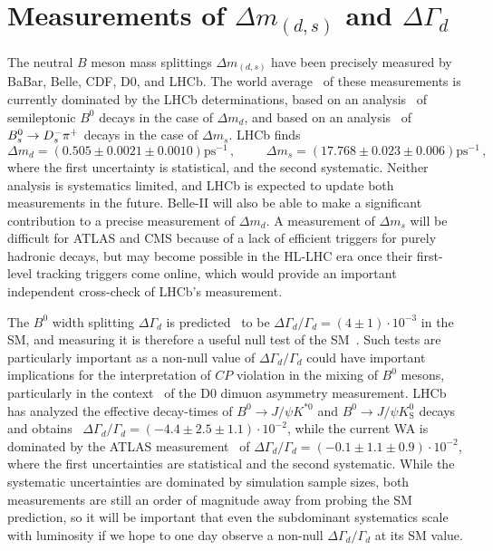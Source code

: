 \section{Measurements of $\Delta m_{(d,s)}$ and $\Delta\Gamma_d$}
\label{sec:dmdgd}

The neutral $B$ meson mass splittings $\Delta m_{(d,s)}$ have been precisely measured by BaBar, Belle, CDF, D0, and LHCb.
The world average~\cite{HFAG} of these measurements is currently dominated by the LHCb determinations,
based on an analysis~\cite{LHCb-PAPER-2015-031} of semileptonic $B^0$ decays in the case of $\Delta m_d$, and based on an analysis~\cite{LHCb-PAPER-2013-006} of $B^0_s \rightarrow {\ensuremath{D}}^-_s \pi^+$ decays
in the case of $\Delta m_s$. LHCb finds
\begin{equation}
\Delta m_d = (0.505 \pm 0.0021 \pm 0.0010) \textrm{ps}^{-1}\,,\phantom{space} 
\Delta m_s = (17.768 \pm 0.023 \pm 0.006) \textrm{ps}^{-1}\,,
\end{equation}
where the first uncertainty is statistical, and the second systematic. Neither analysis is systematics limited,
and LHCb is expected to update both measurements in the future. Belle-II will also be able to make a significant contribution
to a precise measurement of $\Delta m_d$. A measurement of $\Delta m_s$ will be difficult for ATLAS and CMS because of a lack of
efficient triggers for purely hadronic decays, but may become possible in the HL-LHC era once their first-level tracking triggers come online,
which would provide an important independent cross-check of LHCb's measurement.

The $B^0$ width splitting $\Delta\Gamma_d$ is predicted~\cite{Lenz:2011ti} to be $\Delta\Gamma_d/\Gamma_d = (4 \pm 1)\cdot 10^{-3}$ in the SM, and measuring it
is therefore a useful null test of the SM~\cite{Gershon:2010wx}. Such tests are particularly important as a non-null value of $\Delta\Gamma_d/\Gamma_d$ could have important
implications for the interpretation of $CP$ violation in the mixing of $B^0$ mesons, particularly in the context~\cite{Borissov:2013wwa} of the D0 dimuon asymmetry measurement.
LHCb has analyzed the effective decay-times of $B^0 \to J/\psi K^{*0}$
and $B^0 \to J/\psi K^0_\textrm{S}$ decays and obtains~\cite{LHCb-PAPER-2013-065} $\Delta\Gamma_d/\Gamma_d = (-4.4 \pm 2.5 \pm 1.1)\cdot 10^{-2}$,
while the current WA is dominated by the ATLAS measurement~\cite{Aaboud:2016bro}
of $\Delta\Gamma_d/\Gamma_d = (-0.1 \pm 1.1 \pm 0.9)\cdot 10^{-2}$, where the first uncertainties are statistical and the second systematic.
While the systematic uncertainties are dominated by simulation sample sizes, both measurements are still an order
of magnitude away from probing the SM prediction, so it will be important that even the subdominant
systematics scale with luminosity if we hope to one day observe a non-null $\Delta\Gamma_d/\Gamma_d$ at its SM value. 
 
